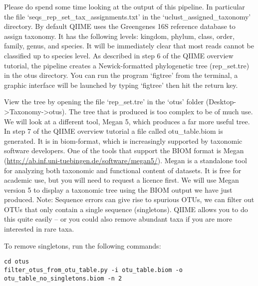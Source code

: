 \begin{note}
\begin{description}[style=multiline,labelindent=0cm,align=right,leftmargin=\descriptionlabelspace,rightmargin=1.5cm,font=\ttfamily]

Please do spend some time looking at the output of this pipeline. In particular the file ‘seqs_rep_set_tax_assignments.txt’ in the ‘uclust_assigned_taxonomy’ directory. By default QIIME uses the Greengenes 16S reference database to assign taxonomy. It has the following levels: kingdom, phylum, class, order, family, genus, and species. It will be immediately clear that most reads cannot be classified up to species level.
As described in step 6 of the QIIME overview tutorial, the pipeline creates a Newick-formatted phylogenetic tree (rep_set.tre) in the otus directory. You can run the program ‘figtree’ from the terminal, a graphic interface will be launched by typing ‘figtree’ then hit the return key.

View the tree by opening the file ‘rep_set.tre’ in the ‘otus’ folder (Desktop->Taxonomy->otus). The tree that is produced is too complex to be of much use. We will look at a different tool, Megan 5, which produces a far more useful tree.
In step 7 of the QIIME overview tutorial a file called otu_table.biom is generated. It is in biom-format, which is increasingly supported by taxonomic software developers. One of the tools that support the BIOM format is Megan (\url{http://ab.inf.uni-tuebingen.de/software/megan5/}). Megan is a standalone tool for analyzing both taxonomic and functional content of datasets. It is free for academic use, but you will need to request a licence first. We will use Megan version 5 to display a taxonomic tree using the BIOM output we have just produced.
Note: Sequence errors can give rise to spurious OTUs, we can filter out OTUs that only contain a single sequence (singletons). QIIME allows you to do this quite easily – or you could also remove abundant taxa if you are more interested in rare taxa.

\end{description}
\end{note}

\begin{steps}
To remove singletons, run the following commands:
\begin{lstlisting}
cd otus
filter_otus_from_otu_table.py -i otu_table.biom -o otu_table_no_singletons.biom -n 2

\end{lstlisting}
\end{steps}

